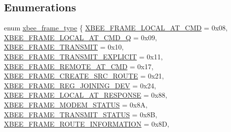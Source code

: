 \subsection*{Enumerations}
\begin{DoxyCompactItemize}
\item 
enum \hyperlink{group__xbee__device_ga7753bbebaf00d6d64942f64b6ae9b7b9}{xbee\+\_\+frame\+\_\+type} \{ \newline
\hyperlink{group__xbee__device_gga7753bbebaf00d6d64942f64b6ae9b7b9a540fdafbf3dbb8b5d07be5888e3573ee}{X\+B\+E\+E\+\_\+\+F\+R\+A\+M\+E\+\_\+\+L\+O\+C\+A\+L\+\_\+\+A\+T\+\_\+\+C\+MD} = 0x08, 
\hyperlink{group__xbee__device_gga7753bbebaf00d6d64942f64b6ae9b7b9a4dccc9c3f9859247218c0d0a93e2582a}{X\+B\+E\+E\+\_\+\+F\+R\+A\+M\+E\+\_\+\+L\+O\+C\+A\+L\+\_\+\+A\+T\+\_\+\+C\+M\+D\+\_\+Q} = 0x09, 
\hyperlink{group__xbee__device_gga7753bbebaf00d6d64942f64b6ae9b7b9a5215c258e8db6c292b9e52ca26011ed1}{X\+B\+E\+E\+\_\+\+F\+R\+A\+M\+E\+\_\+\+T\+R\+A\+N\+S\+M\+IT} = 0x10, 
\hyperlink{group__xbee__device_gga7753bbebaf00d6d64942f64b6ae9b7b9aa673474f9f3597929def38ad4cf7d63e}{X\+B\+E\+E\+\_\+\+F\+R\+A\+M\+E\+\_\+\+T\+R\+A\+N\+S\+M\+I\+T\+\_\+\+E\+X\+P\+L\+I\+C\+IT} = 0x11, 
\newline
\hyperlink{group__xbee__device_gga7753bbebaf00d6d64942f64b6ae9b7b9a44cc0afd79605edfc1f4d5cbb7ed62a2}{X\+B\+E\+E\+\_\+\+F\+R\+A\+M\+E\+\_\+\+R\+E\+M\+O\+T\+E\+\_\+\+A\+T\+\_\+\+C\+MD} = 0x17, 
\hyperlink{group__xbee__device_gga7753bbebaf00d6d64942f64b6ae9b7b9ab2c4deb1aaaab5b5edb54e701d3a3bbe}{X\+B\+E\+E\+\_\+\+F\+R\+A\+M\+E\+\_\+\+C\+R\+E\+A\+T\+E\+\_\+\+S\+R\+C\+\_\+\+R\+O\+U\+TE} = 0x21, 
\hyperlink{group__xbee__device_gga7753bbebaf00d6d64942f64b6ae9b7b9a54fd913d2de57592155023c3a742d85c}{X\+B\+E\+E\+\_\+\+F\+R\+A\+M\+E\+\_\+\+R\+E\+G\+\_\+\+J\+O\+I\+N\+I\+N\+G\+\_\+\+D\+EV} = 0x24, 
\hyperlink{group__xbee__device_gga7753bbebaf00d6d64942f64b6ae9b7b9ae66771334070219cd098c8201936cf4a}{X\+B\+E\+E\+\_\+\+F\+R\+A\+M\+E\+\_\+\+L\+O\+C\+A\+L\+\_\+\+A\+T\+\_\+\+R\+E\+S\+P\+O\+N\+SE} = 0x88, 
\newline
\hyperlink{group__xbee__device_gga7753bbebaf00d6d64942f64b6ae9b7b9adff71d45371cf6b933688c43994b7f81}{X\+B\+E\+E\+\_\+\+F\+R\+A\+M\+E\+\_\+\+M\+O\+D\+E\+M\+\_\+\+S\+T\+A\+T\+US} = 0x8A, 
\hyperlink{group__xbee__device_gga7753bbebaf00d6d64942f64b6ae9b7b9aab7dc62b855e81a5be4cd5515e5f75bb}{X\+B\+E\+E\+\_\+\+F\+R\+A\+M\+E\+\_\+\+T\+R\+A\+N\+S\+M\+I\+T\+\_\+\+S\+T\+A\+T\+US} = 0x8B, 
\hyperlink{group__xbee__device_gga7753bbebaf00d6d64942f64b6ae9b7b9a3efa07f955a3591615319eff03f70e2d}{X\+B\+E\+E\+\_\+\+F\+R\+A\+M\+E\+\_\+\+R\+O\+U\+T\+E\+\_\+\+I\+N\+F\+O\+R\+M\+A\+T\+I\+ON} = 0x8D, 

\end{DoxyCompactItemize}
